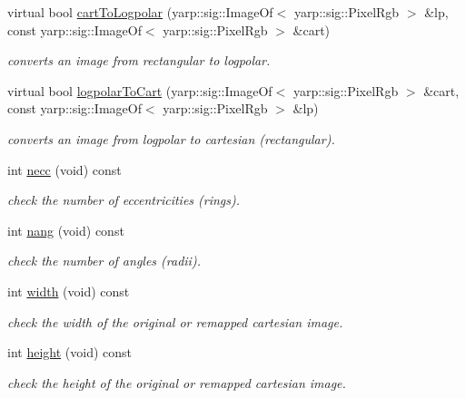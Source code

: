 \begin{DoxyCompactItemize}
virtual bool \hyperlink{classiCub_1_1logpolar_1_1logpolarTransform_ad18d083dcb4dbf5df2e44032bc19eeb3}{cart\+To\+Logpolar} (yarp\+::sig\+::\+Image\+Of$<$ yarp\+::sig\+::\+Pixel\+Rgb $>$ \&lp, const yarp\+::sig\+::\+Image\+Of$<$ yarp\+::sig\+::\+Pixel\+Rgb $>$ \&cart)
\begin{DoxyCompactList}\small\item\em converts an image from rectangular to logpolar. \end{DoxyCompactList}\item 
virtual bool \hyperlink{classiCub_1_1logpolar_1_1logpolarTransform_ac34816fd26d3c5d50da9c80e70d38b7e}{logpolar\+To\+Cart} (yarp\+::sig\+::\+Image\+Of$<$ yarp\+::sig\+::\+Pixel\+Rgb $>$ \&cart, const yarp\+::sig\+::\+Image\+Of$<$ yarp\+::sig\+::\+Pixel\+Rgb $>$ \&lp)
\begin{DoxyCompactList}\small\item\em converts an image from logpolar to cartesian (rectangular). \end{DoxyCompactList}\item 
int \hyperlink{classiCub_1_1logpolar_1_1logpolarTransform_a2bdd1dc52cc95563fb230f2c3aa83a4a}{necc} (void) const 
\begin{DoxyCompactList}\small\item\em check the number of eccentricities (rings). \end{DoxyCompactList}\item 
int \hyperlink{classiCub_1_1logpolar_1_1logpolarTransform_af4f6a4707db1490c17ef3a118da6b75c}{nang} (void) const 
\begin{DoxyCompactList}\small\item\em check the number of angles (radii). \end{DoxyCompactList}\item 
int \hyperlink{classiCub_1_1logpolar_1_1logpolarTransform_aa2442f30a80cb2c03224c7bbef2c4a4b}{width} (void) const 
\begin{DoxyCompactList}\small\item\em check the width of the original or remapped cartesian image. \end{DoxyCompactList}\item 
int \hyperlink{classiCub_1_1logpolar_1_1logpolarTransform_a2fe0ed5bfad6cc4b57ed46387c9ad204}{height} (void) const 
\begin{DoxyCompactList}\small\item\em check the height of the original or remapped cartesian image. \end{DoxyCompactList}\item 

\end{DoxyCompactItemize}
